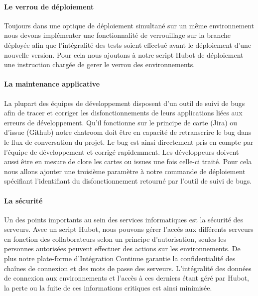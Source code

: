           \paragraph{Le verrou de déploiement} Toujours dans une optique de déploiement simultané sur un même environnement nous devons implémenter une fonctionnalité de verrouillage sur la branche déployée afin que l'intégralité des tests soient effectué avant le déploiement d'une nouvelle version. Pour cela nous ajoutons à notre script Hubot de déploiement une instruction chargée de gerer le verrou des environnements.

          \paragraph{La maintenance applicative} La plupart des équipes de développement disposent d'un outil de suivi de bugs afin de tracer et corriger les disfonctionnements de leurs applications liées aux erreurs de développement. Qu'il fonctionne sur le principe de carte (Jira) ou d'issue (Github) notre chatroom doit être en capacité de retranscrire le bug dans le flux de conversation du projet. Le bug est ainsi directement pris en compte par l'équipe de développement et corrigé rapidemment. Les développeurs doivent aussi être en mesure de clore les cartes ou issues une fois celle-ci traité. Pour cela nous allons ajouter une troisième paramètre à notre commande de déploiement spécifiant l'identifiant du disfonctionnement retourné par l'outil de suivi de bugs.

          \paragraph{La sécurité} Un des points importants au sein des services informatiques est la sécurité des serveurs. Avec un script Hubot, nous pouvons gérer l'accés aux différents serveurs en fonction des collaborateurs selon un principe d'autorisation, seules les personnes autorisées peuvent effectuer des actions sur les environnements. De plus notre plate-forme d'Intégration Continue garantie la confidentialité des chaînes de connexion et des mots de passe des serveurs. L'intégralité des données de connexion aux environnements et l'accès à ces derniers étant géré par Hubot, la perte ou la fuite de ces informations critiques est ainsi minimisée.

